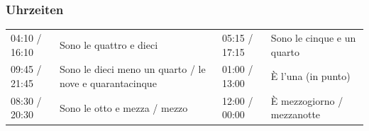 \documentclass[10pt]{scrartcl}
\begin{document}
\subsubsection*{Uhrzeiten}
\begin{tabular}{p{3cm}p{5cm}p{3cm}p{5cm}}
04:10 / 16:10 & Sono le quattro e dieci & 05:15 / 17:15 & Sono le cinque e un quarto\\
09:45 / 21:45 & Sono le dieci meno un quarto / le nove e quarantacinque & 01:00 / 13:00 & È l'una (in punto)\\
08:30 / 20:30 & Sono le otto e mezza / mezzo & 12:00 / 00:00 & È mezzogiorno / mezzanotte\\
\end{tabular}
\end{document}
